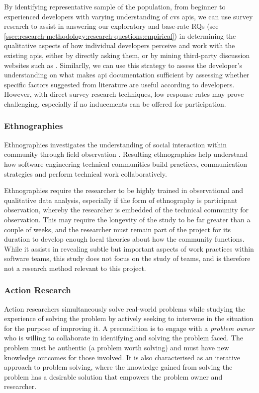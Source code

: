 By identifying representative sample of the population, from beginner to experienced developers with varying understanding of \gls{cvs} \glspl{api}, we can use survey research to assist in answering our exploratory and base-rate RQs (see \cref{ssec:research-methodology:research-questions:empirical}) in determining the qualitative aspects of how individual developers perceive and work with the existing \glspl{api}, either by directly asking them, or by mining third-party discussion websites such as . Similarlly, we can use this strategy to assess the developer's understanding on what makes \gls{api} documentation sufficient by assessing whether specific factors suggested from literature are useful according to developers. However, with direct survey research techniques, low response rates may prove challenging, especially if no inducements can be offered for participation.

\subsubsection{Ethnographies}
Ethnographies investigates the understanding of social interaction within community through field observation \citep{Robinson:2007tp}. Resulting ethnographies help understand how software engineering technical communities build practices, communication strategies and perform technical work collaboratively.

Ethnographies require the researcher to be highly trained in observational and qualitative data analysis, especially if the form of ethnography is participant observation, whereby the researcher is embedded of the technical community for observation. This may require the longevity of the study to be far greater than a couple of weeks, and the researcher must remain part of the project for its duration to develop enough local theories about how the community functions. While it assists in revealing subtle but important aspects of work practices within software teams, this study does not focus on the study of teams, and is therefore not a research method relevant to this project.


\subsubsection{Action Research}
Action researchers simultaneously solve real-world problems while studying the experience of solving the problem \citep{Davison:2004wo} by actively seeking to intervene in the situation for the purpose of improving it. A precondition is to engage with a \textit{problem owner} who is willing to collaborate in identifying and solving the problem faced. The problem must be authentic (a problem worth solving) and must have new knowledge outcomes for those involved. It is also characterised as an iterative approach to problem solving, where the knowledge gained from solving the problem has a desirable solution that empowers the problem owner and researcher.

